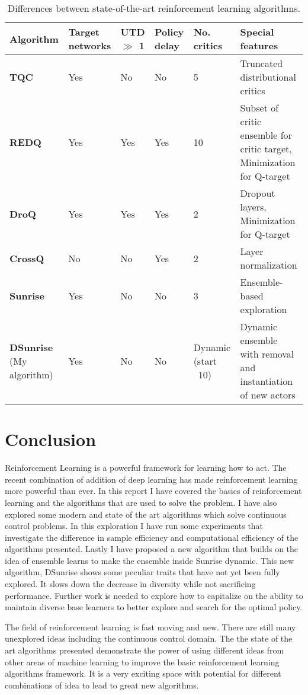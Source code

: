 \begin{table}[H]
    \footnotesize
    \centering
    \renewcommand{\arraystretch}{1.4} %
    \begin{tabularx}{\textwidth}{X | X X X X p{}}
        \hline
        \textbf{Algorithm} & \textbf{Target networks} & \textbf{UTD $\gg$ 1} & \textbf{Policy delay} & \textbf{No. critics} & \textbf{Special features} \\
        \hline
        \textbf{TQC}     & Yes & No  & No  & 5 & Truncated distributional critics \\
        \textbf{REDQ}    & Yes & Yes & Yes & 10 & Subset of critic ensemble for critic target, Minimization for Q-target \\
        \textbf{DroQ}    & Yes & Yes & Yes & 2 & Dropout layers, Minimization for Q-target \\
        \textbf{CrossQ}  & No  & No  & Yes & 2 & Layer normalization \\
        \textbf{Sunrise} & Yes & No  & No & 3 & Ensemble-based exploration \\
        \textbf{DSunrise} (My algorithm) & Yes & No  & No & Dynamic (start ~10) & Dynamic ensemble with removal and instantiation of new actors \\
        \hline
    \end{tabularx}
    \caption{Differences between state-of-the-art reinforcement learning algorithms.}
\end{table}


\section{Conclusion}

Reinforcement Learning is a powerful framework for learning how to act. The recent combination of addition of deep learning has made reinforcement learning more powerful than ever. In this report I have covered the basics of reinforcement learning and the algorithms that are used to solve the problem. I have also explored some modern and state of the art algorithms which solve continuous control problems. In this exploration I have run some experiments that investigate the difference in sample efficiency and computational efficiency of the algorithms presented. Lastly I have proposed a new algorithm that builds on the idea of ensemble learns to make the ensemble inside Sunrise dynamic. This new algorithm, DSunrise shows some peculiar traits that have not yet been fully explored. It slows down the decrease in diversity while not sacrificing performance. Further work is needed to explore how to capitalize on the ability to maintain diverse base learners to better explore and search for the optimal policy.

The field of reinforcement learning is fast moving and new. There are still many unexplored ideas including the continuous control domain. The the state of the art algorithms presented demonstrate the power of using different ideas from other areas of machine learning to improve the basic reinforcement learning algorithms framework. It is a very exciting space with potential for different combinations of idea to lead to great new algorithms.